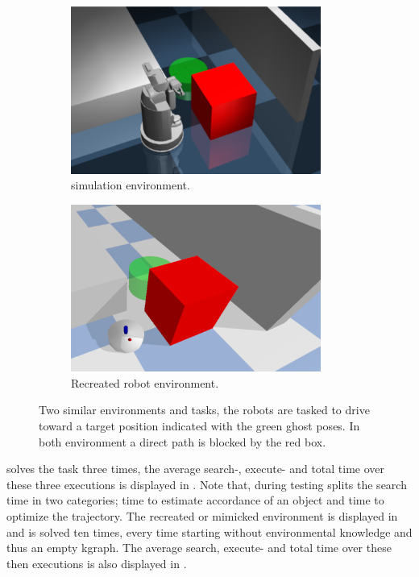 \begin{figure}[H]
    \centering
    \begin{subfigure}{.49\textwidth}
    \centering
    \includegraphics[width=0.9\textwidth]{figures/results/wang_env}
    \caption{\citeauthor{wang_affordancebased_2020} simulation environment.}%
    \label{subfig:wang_env}
    \end{subfigure}
    \hfill
    \begin{subfigure}{.49\textwidth}
    \centering
    \includegraphics[width=0.9\textwidth]{figures/results/wang_mimick}
    \caption{Recreated robot environment.}%
    \label{subfig:wang_mimick}
    \end{subfigure}
    \caption{Two similar environments and tasks, the robots are tasked to drive toward a target position indicated with the green ghost poses. In both environment a direct path is blocked by the red box.}%
    \label{fig:wang}
\end{figure}

\citeauthor{wang_affordancebased_2020} solves the task three times, the average search-, execute- and total time over these three executions is displayed in . Note that, during testing \citeauthor{wang_affordancebased_2020} splits the search time in two categories; time to estimate accordance of an object and time to optimize the trajectory. The recreated or mimicked environment is displayed in  and is solved ten times, every time starting without environmental knowledge and thus an empty \ac{kgraph}. The average search, execute- and total time over these then executions is also displayed in .\bs

